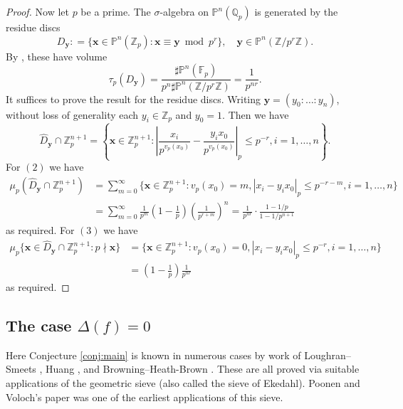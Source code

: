 \documentclass[a4paper,12pt,reqno]{amsart}
\numberwithin{equation}{section} \numberwithin{figure}{section}
\newcommand{\x}{\mathbf{x}}
\newcommand{\y}{\mathbf{y}}
\newcommand\F{\mathbb{F}}
\renewcommand\P{\mathbb{P}}
\newcommand\Z{\mathbb{Z}}
\newcommand\Q{\mathbb{Q}}
\newcommand\ZZ{\mathbb{Z}}
\renewcommand{\leq}{\leqslant}
\renewcommand{\#}{\sharp}
\theoremstyle{definition}
\numberwithin{lemma}{section}
\begin{document}
\begin{proof}
	Now let $p$ be a prime.  
	The $\sigma$-algebra on $\P^n(\Q_p)$ is generated by the residue discs
	$$D_{\mathbf{y}} : = \{ \x \in \P^n(\Z_p) : \x \equiv \y \bmod p^r\}, \quad \y \in \P^n(\Z/p^r\Z).$$
	By \cite[Thm.~2.13]{Sal98}, these have volume
	$$\tau_p(D_\y) = \frac{\#\P^n(\F_p)}{p^n\#\P^n(\Z/p^r\Z)}
	= \frac{1}{p^{nr}}.$$
	It suffices to prove the result for the residue discs. Writing $\y = (y_0:\dots:y_n)$,
	without loss of generality each $y_i \in \Z_p$ and $y_0 = 1$. Then we have
	$$\widehat{D}_{\mathbf{y}} \cap \Z_p^{n+1} = 
	\left\{ \mathbf{x} \in \ZZ_p^{n+1} : \left| \frac{x_i}{p^{v_p(x_0)}} - \frac{y_ix_0}{p^{v_p(x_0)}} \right|_p \leq p^{-r}, i = 1,\dots,n\right\}.$$
	For $(2)$ we have
	\begin{align*}
		\mu_p(\widehat{D}_{\mathbf{y}}\cap \ZZ_p^{n+1}) & = \sum_{m = 0}^\infty 
		\{ \mathbf{x} \in \ZZ_p^{n+1} : v_p(x_0) = m, |x_i - y_i x_0|_p \leq p^{-r-m}, i = 1,\dots,n\}	\\
		& = \sum_{m = 0}^\infty \frac{1}{p^m} \left(1 - \frac{1}{p}\right) \left(\frac{1}{p^{r+m}}\right)^n	 
		 = \frac{1}{p^{nr}} \cdot \frac{1-1/p}{1-1/p^{n+1}}
	\end{align*}
	as required. 
	For $(3)$ we have
	\begin{align*}
		\mu_p\{ \x \in \widehat{D}_{\mathbf{y}} \cap \Z_p^{n+1} : p \nmid \x\} & = 
		\{ \mathbf{x} \in \ZZ_p^{n+1} : v_p(x_0) = 0, |x_i - y_i x_0|_p \leq p^{-r}, i = 1,\dots,n\}	\\
		& = \left(1 - \frac{1}{p}\right) \frac{1}{p^{nr}}	 
	\end{align*}
	as required.
\end{proof}

\subsection{The case $\Delta(f) = 0$}
Here Conjecture \ref{conj:main} is known in numerous cases by work of Loughran--Smeets \cite{LS16}, Huang \cite{Hua21}, and Browning--Heath-Brown \cite{BHB21}. These are all proved via suitable applications of the geometric sieve (also called the sieve of Ekedahl). Poonen and Voloch's  \cite{PV04} paper was one of the earliest applications of this sieve.
\end{document}
